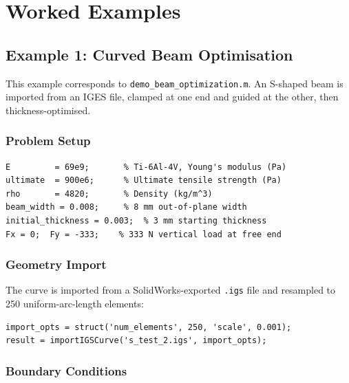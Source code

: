 \chapter{Worked Examples}
\label{ch:examples}

\section{Example 1: Curved Beam Optimisation}
\label{sec:ex:beam}

This example corresponds to \texttt{demo\_beam\_optimization.m}.  An S-shaped
beam is imported from an IGES file, clamped at one end and guided at the
other, then thickness-optimised.

\subsection{Problem Setup}

\begin{lstlisting}[caption={Material and loading definition.}]
E         = 69e9;       % Ti-6Al-4V, Young's modulus (Pa)
ultimate  = 900e6;      % Ultimate tensile strength (Pa)
rho       = 4820;       % Density (kg/m^3)
beam_width = 0.008;     % 8 mm out-of-plane width
initial_thickness = 0.003;  % 3 mm starting thickness
Fx = 0;  Fy = -333;    % 333 N vertical load at free end
\end{lstlisting}

\subsection{Geometry Import}

The curve is imported from a SolidWorks-exported \texttt{.igs} file and
resampled to 250 uniform-arc-length elements:

\begin{lstlisting}[caption={Importing the beam centreline.}]
import_opts = struct('num_elements', 250, 'scale', 0.001);
result = importIGSCurve('s_test_2.igs', import_opts);
\end{lstlisting}

\subsection{Boundary Conditions}

